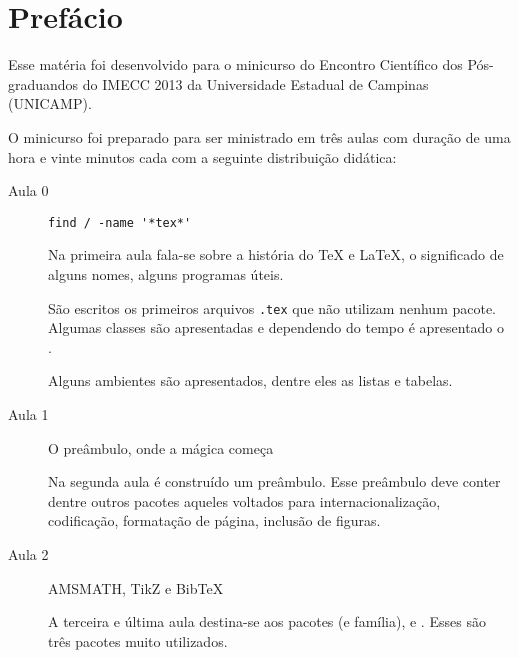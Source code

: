 \chapter{Prefácio}
Esse matéria foi desenvolvido para o minicurso do Encontro Científico dos
Pós-graduandos do IMECC 2013 da Universidade Estadual de Campinas (UNICAMP).

O minicurso foi preparado para ser ministrado em três aulas com duração de uma
hora e vinte minutos cada com a seguinte distribuição didática:
\begin{description}
  \item[Aula 0] \lstinline+find / -name '*tex*'+

    Na primeira aula fala-se sobre a história do TeX e LaTeX, o significado de
    alguns nomes, alguns programas úteis.

    São escritos os primeiros arquivos \lstinline+.tex+ que não utilizam nenhum
    pacote. Algumas classes são apresentadas e dependendo do tempo é apresentado
    o .

    Alguns ambientes são apresentados, dentre eles as listas e tabelas.

  \item[Aula 1] O preâmbulo, onde a mágica começa

    Na segunda aula é construído um preâmbulo. Esse preâmbulo deve conter dentre
    outros pacotes aqueles voltados para internacionalização, codificação,
    formatação de página, inclusão de figuras.

  \item[Aula 2] AMSMATH, TikZ e BibTeX

    A terceira e última aula destina-se aos pacotes  (e
    família),  e . Esses são três pacotes muito
    utilizados.
\end{description}

